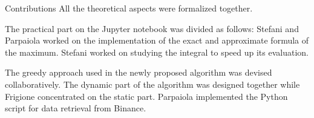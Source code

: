 \begin{projsection}{Contributions}
	All the theoretical aspects were formalized together.
	
	The practical part on the Jupyter notebook was divided as follows: Stefani and Parpaiola worked on the implementation of the exact and approximate formula of the maximum.
	Stefani worked on studying the integral to speed up its evaluation.
	
	The greedy approach used in the newly proposed algorithm was devised collaboratively.
	The dynamic part of the algorithm was designed together while Frigione concentrated on the static part.
	Parpaiola implemented the Python script for data retrieval from Binance.
\end{projsection}


	
	
	
	
	
	
	
